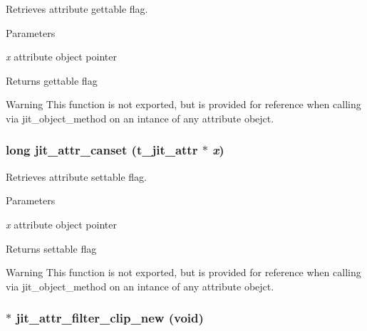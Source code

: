 Retrieves attribute gettable flag. 
\begin{DoxyParams}{Parameters}
\item[{\em x}]attribute object pointer\end{DoxyParams}
\begin{DoxyReturn}{Returns}
gettable flag
\end{DoxyReturn}
\begin{DoxyWarning}{Warning}
This function is not exported, but is provided for reference when calling via jit\_\-object\_\-method on an intance of any attribute obejct. 
\end{DoxyWarning}
\hypertarget{group__attrmod_ga4cbadd8a5fb907e34faaef5368d2448e}{
\subsubsection[{jit\_\-attr\_\-canset}]{\setlength{\rightskip}{0pt plus 5cm}long jit\_\-attr\_\-canset ({\bf t\_\-jit\_\-attr} $\ast$ {\em x})}}
\label{group__attrmod_ga4cbadd8a5fb907e34faaef5368d2448e}


Retrieves attribute settable flag. 
\begin{DoxyParams}{Parameters}
\item[{\em x}]attribute object pointer\end{DoxyParams}
\begin{DoxyReturn}{Returns}
settable flag
\end{DoxyReturn}
\begin{DoxyWarning}{Warning}
This function is not exported, but is provided for reference when calling via jit\_\-object\_\-method on an intance of any attribute obejct. 
\end{DoxyWarning}
\hypertarget{group__attrmod_ga867b4b84b380c259b0dada694b119fef}{
\subsubsection[{jit\_\-attr\_\-filter\_\-clip\_\-new}]{ $\ast$ jit\_\-attr\_\-filter\_\-clip\_\-new (void)}}
\label{group__attrmod_ga867b4b84b380c259b0dada694b119fef}



